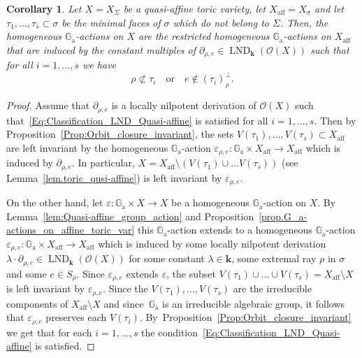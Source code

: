 \documentclass[JEP,XML,SOM,Unicode]{cedram}
\let\mathcal\mathscr
\newcommand{\ra}{\mathrm{a}}
\let\oldbot\bot
\renewcommand{\bot}{{\scriptscriptstyle\oldbot}}
\theoremstyle{plain}
\newtheorem{corollary}[theorem]{Corollary}
\theoremstyle{definition}
\DeclareMathOperator{\aff}{aff}
\DeclareMathOperator{\LND}{LND}
\newcommand{\OO}{\mathcal{O}}
\newcommand{\GG}{\mathbb{G}}
\newcommand{\kk}{{\boldsymbol{k}}}
\begin{document}
\begin{corollary}
\label{Cor:Classification_LND_Quasi-affine}
Let $X = X_{\Sigma}$ be a quasi-affine toric variety, let $X_{\aff} = X_\sigma$ and let $\tau_1, \ldots, \tau_s \subset \sigma$
be the minimal faces of $\sigma$ which do not belong to $\Sigma$. Then, the homogeneous
$\GG_\ra$-actions on $X$ are the restricted homogeneous $\GG_\ra$-actions on $X_{\aff}$ that
are induced by the constant multiples of $\partial_{\rho, e} \in \LND_{\kk}(\OO(X))$
such that
for all $i = 1, \ldots, s$ we have
\[
\label{Eq:Classification_LND_Quasi-affine}
\tag{$\circledast$}
\rho \not\subset \tau_i \quad \textrm{or} \quad e \not\in (\tau_i)_{\rho}^\bot.
\]
\end{corollary}

\begin{proof}
Assume that $\partial_{\rho, e}$ is a locally nilpotent derivation of $\OO(X)$
such that~\eqref{Eq:Classification_LND_Quasi-affine} is satisfied for all $i =1, \ldots, s$.
Then by Proposition~\ref{Prop:Orbit_closure_invariant}, the sets $V(\tau_1), \ldots, V(\tau_s) \subset X_{\aff}$
are left invariant by the homogeneous $\GG_\ra$-action
$\varepsilon_{\rho, e} \colon \GG_\ra \times X_{\aff} \to X_{\aff}$
which is induced by $\partial_{\rho, e}$.
In particular, $X = X_{\aff} \setminus (V(\tau_1) \cup \ldots V(\tau_s))$ (see Lemma~\ref{lem.toric_qusi-affine}) is left
invariant by $\varepsilon_{\rho, e}$.

On the other hand, let $\varepsilon \colon \GG_\ra \times X \to X$ be a homogeneous $\GG_\ra$-action on $X$.
By Lemma~\ref{lem:Quasi-affine_group_action} and Proposition~\ref{prop.G_a-actions_on_affine_toric_var}
this $\GG_\ra$-action extends to a homogeneous $\GG_\ra$-action
$\varepsilon_{\rho, e} \colon \GG_\ra \times X_{\aff} \to X_{\aff}$ which is induced
by some locally nilpotent derivation $\lambda \cdot \partial_{\rho, e} \in \LND_{\kk}(\OO(X))$ for some
constant $\lambda \in \kk$, some
extremal ray $\rho$ in $\sigma$ and some $e \in S_{\rho}$. Since $\varepsilon_{\rho, e}$ extends
$\varepsilon$, the subset $V(\tau_1) \cup \ldots \cup V(\tau_s) = X_{\aff} \setminus X$ is left
invariant by $\varepsilon_{\rho, e}$. Since the $V(\tau_1), \ldots, V(\tau_s)$ are the
irreducible components of $X_{\aff} \setminus X$ and since~$\GG_\ra$ is an irreducible algebraic group, it follows that $\varepsilon_{\rho, e}$ preserves each $V(\tau_i)$.
By~Proposition~\ref{Prop:Orbit_closure_invariant} we get that for each $i=1, \ldots, s$
the condition~\eqref{Eq:Classification_LND_Quasi-affine} is satisfied.
\end{proof}
\end{document}
